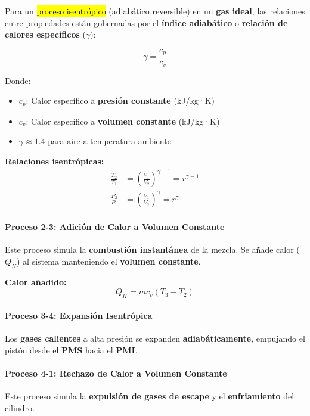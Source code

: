\documentclass{article}
\begin{document}
    Para un \hl{proceso isentrópico} (adiabático reversible) en un \textbf{gas ideal}, las relaciones entre propiedades están gobernadas por el \textbf{índice adiabático} o \textbf{relación de calores específicos} ($\gamma$):

    \begin{equation}
    \gamma = \frac{c_p}{c_v}
    \end{equation}

    Donde:
    \begin{itemize}
        \item $c_p$: Calor específico a \textbf{presión constante} (kJ/kg·K)
        \item $c_v$: Calor específico a \textbf{volumen constante} (kJ/kg·K)
        \item $\gamma \approx 1.4$ para aire a temperatura ambiente
    \end{itemize}

    \textbf{Relaciones isentrópicas:}
    \begin{align}
    \frac{T_2}{T_1} &= \left(\frac{V_1}{V_2}\right)^{\gamma-1} = r^{\gamma-1} \\
    \frac{P_2}{P_1} &= \left(\frac{V_1}{V_2}\right)^{\gamma} = r^{\gamma}
    \end{align}

    \paragraph{Proceso 2-3: Adición de Calor a Volumen Constante}
    Este proceso simula la \textbf{combustión instantánea} de la mezcla. Se añade calor ($Q_H$) al sistema manteniendo el \textbf{volumen constante}.

    \textbf{Calor añadido:}
    \begin{equation}
    Q_H = m c_v (T_3 - T_2)
    \end{equation}

    \paragraph{Proceso 3-4: Expansión Isentrópica}
    Los \textbf{gases calientes} a alta presión se expanden \textbf{adiabáticamente}, empujando el pistón desde el \textbf{PMS} hacia el \textbf{PMI}.

    \paragraph{Proceso 4-1: Rechazo de Calor a Volumen Constante}
    Este proceso simula la \textbf{expulsión de gases de escape} y el \textbf{enfriamiento} del cilindro.
\end{document}

